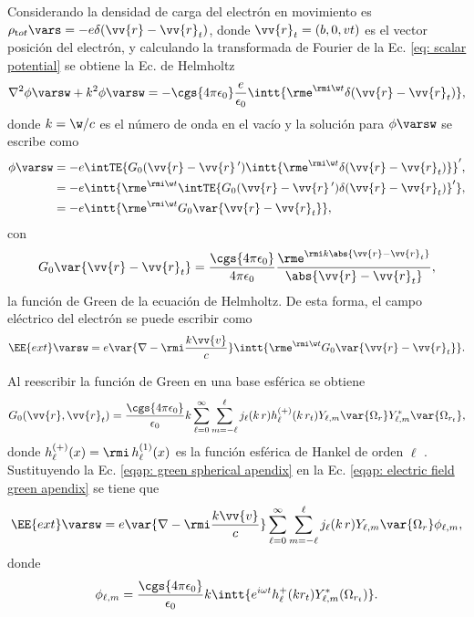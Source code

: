 Considerando la densidad de carga del electrón en movimiento es $\rho_{\text tot}\vars = -e \delta(\vv{r}-\vv{r}_t)$, donde $\vv{r}_t = (b,0,vt)$ es el vector posición del electrón, y calculando la transformada de Fourier de la Ec. \eqref{eq: scalar potential} se obtiene la Ec. de Helmholtz
\begin{equation}
\nabla^2\phi\varsw + k^2\phi\varsw = -\cgs{4\pi\epsilon_0}\frac{e}{\epsilon_0}\intt{\rme^{\rmi \w t} \delta(\vv{r}-\vv{r}_t)},
\end{equation}
donde $k = \w/c$ es el número de onda en el vacío y la solución para $\phi\varsw$ se escribe como \cite{maciel2019electromagnetic, de1999relativistic, barton1989elements} 
\begin{align}
\phi\varsw &= -e\intTE{G_0(\vv{r}-\vv{r}\,^{\prime})\intt{\rme^{\rmi \w t}\delta(\vv{r}-\vv{r}_t)}}^{\prime},\\
		   &= -e\intt{\rme^{\rmi \w t} \intTE{ G_0(\vv{r}-\vv{r}\,^{\prime}) \delta(\vv{r}-\vv{r}_t)}^{\prime}},\\
		   &= -e\intt{\rme^{\rmi \w t}G_0\var{\vv{r}-\vv{r}_t}},
\end{align}
con 
\begin{equation}
G_0\var{\vv{r}-\vv{r}_t} = \frac{\cgs{4\pi\epsilon_0}}{4\pi\epsilon_0}\frac{\rme^{\rmi k \abs{\vv{r}-\vv{r}_t}}}{\abs{\vv{r}-\vv{r}_t}},
\end{equation}
la función de Green de la ecuación de Helmholtz. De esta forma, el campo eléctrico del electrón se puede escribir como
\begin{equation}
\EE{ext}\varsw = e\var{\nabla-\rmi \frac{k\vv{v}}{c}} \intt{\rme^{\rmi \w t} G_0 \var{\vv{r}-\vv{r}_t}}. 
\label{eqap: electric field green apendix}
\end{equation}

Al reescribir la función de Green en una base esférica se obtiene \cite{de1999relativistic}
\begin{equation}
G_0(\vv{r},\vv{r}_t)=\frac{\cgs{4\pi\epsilon_0}}{\epsilon_0} k \sum_{\ell=0}^{\infty}\sum_{m=-\ell}^{\ell} j_{\ell}(k \, r) h_{\ell}^{(+)}(k \, r_t) Y_{\ell,m}\var{\Omega_r} Y_{\ell, m}^{*}\var{\Omega_{r_t}}, \label{eqap: green spherical apendix}
\end{equation}
donde $h_{\ell}^{(+)}(x)= \rmi \, h_{\ell}^{(1)}(x)$ es la función esférica de Hankel de orden $\ell$ \cite{Abramowitz}. Sustituyendo la Ec. \eqref{eqap: green spherical apendix} en la Ec. \eqref{eqap: electric field green apendix} se tiene que 
\begin{equation}
\EE{ext}\varsw = e\var{\nabla-\rmi \frac{k\vv{v}}{c}} \sum_{\ell=0}^{\infty}\sum_{m=-\ell}^{\ell} j_{\ell}(k \, r) Y_{\ell,m}\var{\Omega_r} \phi_{\ell, m},
\label{eqap: ext electric field spherical}
\end{equation}
donde 
\begin{equation}
\phi_{\ell, m} = \frac{\cgs{4\pi\epsilon_0}}{\epsilon_0} k \intt{e^{i \omega t} h_{\ell}^{+}(k r_{t}) Y_{\ell, m}^{*}(\Omega_{r_t}) }.
\label{eqap: phi lm apendix}
\end{equation}

